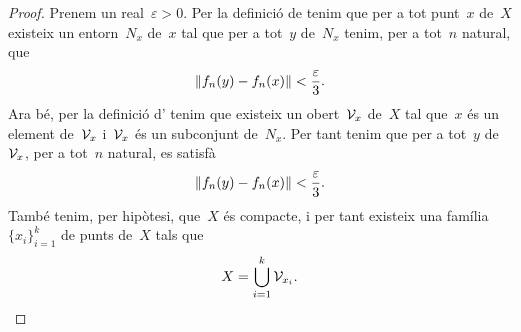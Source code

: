 \documentclass[../../main.tex]{subfiles}
\begin{document}
    \begin{proof}
        Prenem un real~\(\varepsilon>0\).
        Per la definició de  tenim que per a tot punt~\(x\) de~\(X\) existeix un entorn~\(N_{x}\) de~\(x\) tal que per a tot~\(y\) de~\(N_{x}\) tenim, per a tot~\(n\) natural, que
        \[
            \norm{f_{n}(y)-f_{n}(x)}<\frac{\varepsilon}{3}.
        \]
        Ara bé, per la definició d' tenim que existeix un obert~\(\mathcal{V}_{x}\) de~\(X\) tal que~\(x\) és un element de~\(\mathcal{V}_{x}\) i~\(\mathcal{V}_{x}\) és un subconjunt de~\(N_{x}\).
        Per tant tenim que per a tot~\(y\) de~\(\mathcal{V}_{x}\), per a tot~\(n\) natural, es satisfà
        \begin{equation}
            \label{thm:Teorema d'Arzelà-Ascoli:eq2}
            \norm{f_{n}(y)-f_{n}(x)}<\frac{\varepsilon}{3}.
        \end{equation}
        També tenim, per hipòtesi, que~\(X\) és compacte, i per tant existeix una família~\(\{x_{i}\}_{i=1}^{k}\) de punts de~\(X\) tals que
        \begin{equation}
            \label{thm:Teorema d'Arzelà-Ascoli:eq1}
            X=\bigcup_{i=1}^{k}\mathcal{V}_{x_{i}}.
        \end{equation}


\end{proof}
\end{document}
